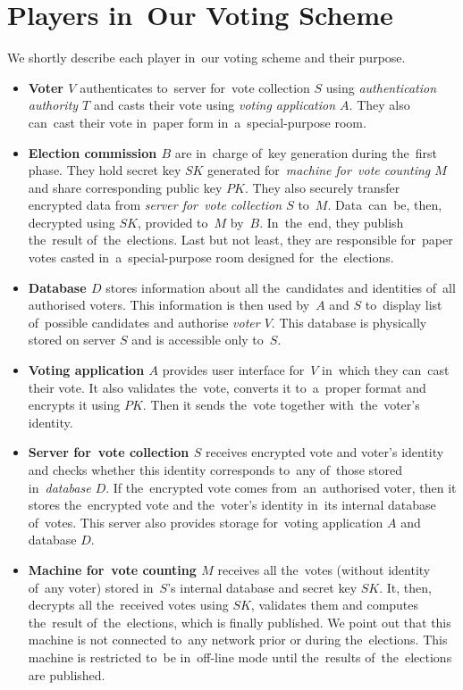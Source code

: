 \section{Players in~Our Voting Scheme}
We shortly describe each player in~our voting scheme and their purpose.
\begin{itemize}
\item \textbf{Voter $V$} authenticates to~server for~vote collection $S$ using \emph{authentication authority $T$} and casts their vote using \emph{voting application $A$}. They also can~cast their vote in~paper form in~a~special-purpose room.
\item \textbf{Election commission $B$} are in~charge of~key generation during the~first phase. They hold secret key $SK$ generated for~\emph{machine for~vote counting $M$} and share corresponding public key $PK$. They also securely transfer encrypted data from \emph{server for~vote collection $S$} to~$M$. Data~can~be, then, decrypted using $SK$, provided to~$M$ by~$B$. In~the~end, they publish the~result of~the~elections. Last but not least, they are responsible for~paper votes casted in~a~special-purpose room designed for~the~elections.
\item \textbf{Database $D$} stores information about all the~candidates and identities of~all authorised voters. This information is then used by~$A$ and $S$ to~display list of~possible candidates and authorise \emph{voter $V$}. This database is physically stored on server $S$ and is accessible only to~$S$.
\item \textbf{Voting application $A$} provides user interface for~$V$ in~which they can~cast their vote. It also validates the~vote, converts it to~a~proper format and encrypts it using $PK$. Then it sends the~vote together with~the~voter's identity.
\item \textbf{Server for~vote collection $S$} receives encrypted vote and voter's identity and checks whether this identity corresponds to~any of~those stored in~\emph{database $D$}. If the~encrypted vote comes from~an~authorised voter, then it stores the~encrypted vote and the~voter's identity in~its internal database of~votes. This server also provides storage for~voting application $A$ and database $D$.
\item \textbf{Machine for~vote counting $M$} receives all the~votes (without identity of~any voter) stored in~$S$'s internal database and secret key $SK$. It, then, decrypts all the~received votes using $SK$, validates them and computes the~result of~the~elections, which is finally published. We point out that this machine is not connected to~any network prior or during the~elections. This machine is restricted to~be in~off-line mode until the~results of~the~elections are published. %

\end{itemize}
